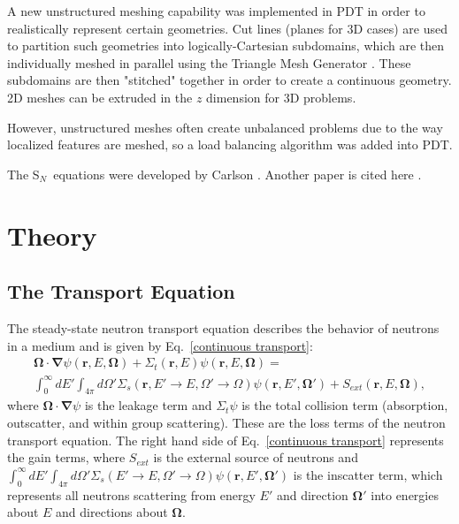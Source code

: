 \documentclass{anstrans}
\newcommand{\SN}{S$_N$}
\renewcommand{\vec}[1]{\bm{#1}} %
\newcommand{\vr}{\vec{r}}
\newcommand{\vo}{\vec{\Omega}}
\begin{document}
A new unstructured meshing capability was implemented in PDT in order to realistically represent certain geometries. Cut lines (planes for 3D cases) are used to partition such geometries into logically-Cartesian subdomains, which are then individually meshed in parallel using the Triangle Mesh Generator \cite{triangle}. These subdomains are then "stitched" together in order to create a continuous geometry. 2D meshes can be extruded in the $z$ dimension for 3D problems. 

However, unstructured meshes often create unbalanced problems due to the way localized features are meshed, so a load balancing algorithm was added into PDT. 


The \SN\ equations were developed by Carlson \cite{Car1953}. Another
paper is cited here \cite{Lar2008}.

\section{Theory}
\subsection{The Transport Equation}
The steady-state neutron transport equation describes the behavior of neutrons in a medium and is given by Eq.~\eqref{continuous transport}:
\begin{multline}
\vo \cdot \vec \nabla \psi(\vr,E,\vo) +\Sigma_t(\vr,E) \psi(\vr,E,\vo)  = \\
\int_{0}^{\infty}dE' \int_{4\pi}d\Omega' \Sigma_s(\vr,E'\to E, \Omega'\to\Omega)\psi(\vr,E',\vo') 
+ S_{ext}(\vr,E,\vo) ,
\label{continuous transport}
\end{multline}
where $\vec{\Omega}\cdot \vec\nabla\psi$ is the leakage term and $\Sigma_t\psi$ is the total collision term (absorption, outscatter, and within group scattering). These are the loss terms of the neutron transport equation. The right hand side of Eq.~\eqref{continuous transport} represents the gain terms, where $S_{ext}$ is the external source of neutrons and $\int_{0}^{\infty}dE'\int_{4\pi}d\Omega'\Sigma_s(E'\to E, \Omega'\to\Omega)\psi(\vr,E',\vo')$ is the inscatter term, which represents all neutrons scattering from energy $E'$ and direction $\vo'$ into energies about $E$ and directions about $\vo$. 
\end{document}
